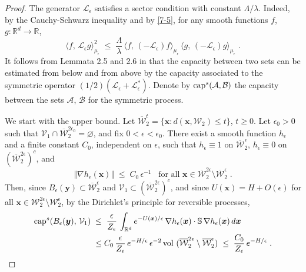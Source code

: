\documentclass[reqno]{amsart}
\newcounter{as}[section]
\newcommand{\mc}[1]{{\mathcal #1}}
\newcommand{\bb}[1]{{\mathbb #1}}
\newcommand{\<}{\langle}
\renewcommand{\>}{\rangle}
\begin{document}
\begin{proof}
The generator $\mc L_\epsilon$ satisfies a sector condition with
constant $\Lambda/\lambda$. Indeed, by the Cauchy-Schwarz inequality and by \eqref{7-5},
for any smooth functions $f$, $g:\bb R^d\to \bb R$,
\begin{equation*}
\< f ,\, \mc L_\epsilon g \>^2_{\mu_\epsilon} \;\le\; \frac{\Lambda}\lambda\,
\< f ,\, (- \mc L_\epsilon) f \>_{\mu_\epsilon} \,
\< g ,\,(-\mc L_\epsilon) g \>_{\mu_\epsilon}\;.
\end{equation*}
It follows from Lemmata 2.5 and 2.6 in \cite{GL} that the capacity
between two sets can be estimated from below and from above by the
capacity associated to the symmetric operator $(1/2) (\mc L_\epsilon +
\mc L^*_\epsilon)$. Denote by $\textup{cap}^{s}(\mc A, \mc B)$ the
capacity between the sets $\mc A$, $\mc B$ for the symmetric process.

We start with the upper bound.  Let $\overline{\mathcal{W}}_{2}^{t} =
\{\boldsymbol{x}: d(\boldsymbol{x}, \mathcal{W}_{2}) \le t\}$, $t\ge
0$. Let $\epsilon_0>0$ such that $\mathcal{V}_{1} \cap
\overline{\mathcal{W}}_{2}^{2\epsilon_0} = \varnothing$, and fix $0<\epsilon<
\epsilon_0$. There exist a smooth function $h_{\epsilon}$ and a finite
constant $C_0$, independent on $\epsilon$, such that
$h_{\epsilon}\equiv 1$ on $\overline{\mathcal{W}}_{2}^{\epsilon}$,
$h_{\epsilon}\equiv 0$ on $(\overline{\mathcal{W}}_{2}^{2\epsilon})^{c}$, and
\begin{equation*}
\Vert \nabla h_{\epsilon}(\boldsymbol{x})\Vert\;\le\;
C_0\, \epsilon^{-1}\;\;\;\mbox{for all }
\boldsymbol{x}\in\overline{\mathcal{W}}_{2}^{2\epsilon}
\setminus\overline{\mathcal{W}}_{2}^{\epsilon}\;.
\end{equation*}
Then, since
$B_{\epsilon}(\boldsymbol{y})\subset\overline{\mathcal{W}}_{2}^{\epsilon}$ and
$\mathcal{V}_{1}\subset(\overline{\mathcal{W}}_{2}^{2\epsilon})^{c}$, and since
$U(\boldsymbol{x})=H+O(\epsilon)$ for all
$\boldsymbol{x}\in\mathcal{W}_{2}^{2\epsilon}\setminus\mathcal{W}_{2}^{\epsilon}$,
by the Dirichlet's principle for reversible processes,
\begin{align*}
\textup{cap}^{s}(B_{\epsilon}(\boldsymbol{y}),\,\mathcal{V}_{1})
\; &\le\; \frac{\epsilon}{Z_\epsilon} \, \int_{\mathbb{R}^{d}}
e^{-U(\boldsymbol{x})/\epsilon}\, \nabla h_{\epsilon}(\boldsymbol{x})
\cdot\mathbb{S}\, \nabla h_{\epsilon}(\boldsymbol{x})\, d\boldsymbol{x} \\
& \le C_0 \, \frac{\epsilon}{Z_\epsilon} \,
e^{-H/\epsilon}\, \epsilon^{-2}
\, \mbox{vol }(\overline{\mathcal{W}}_{2}^{2\epsilon}
\setminus\overline{\mathcal{W}}_{2}^{\epsilon})
\;\le \; \frac{C_0}{Z_\epsilon} \, e^{-H/\epsilon}\;.
\end{align*}


\end{proof}
\end{document}
